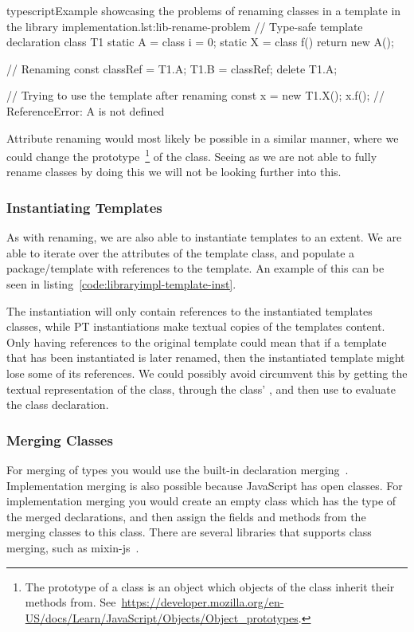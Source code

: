 \begin{code}{typescript}{Example showcasing the problems of renaming classes in a template in the library implementation.}{lst:lib-rename-problem}
    // Type-safe template declaration
    class T1 {
        static A = class {
            i = 0;
        }
        static X = class {
            f() {
                return new A();
            }
        }
    }

   // Renaming
    const classRef = T1.A;
    T1.B = classRef;
    delete T1.A;

    // Trying to use the template after renaming
    const x = new T1.X();
    x.f(); // ReferenceError: A is not defined
\end{code}

Attribute renaming would most likely be possible in a similar manner, where we could change the prototype~\footnote{The prototype of a class is an object which objects of the class inherit their methods from. See~\url{https://developer.mozilla.org/en-US/docs/Learn/JavaScript/Objects/Object_prototypes}.} of the class.
Seeing as we are not able to fully rename classes by doing this we will not be looking further into this.

\subsubsection{Instantiating Templates}\label{subsubsec:instantiating-templates}

As with renaming, we are also able to instantiate templates to an extent.
We are able to iterate over the attributes of the template class, and populate a package/template with references to the template.
An example of this can be seen in listing~\vref{code:libraryimpl-template-inst}.


The instantiation will only contain references to the instantiated templates classes, while PT instantiations make textual copies of the templates content.
Only having references to the original template could mean that if a template that has been instantiated is later renamed, then the instantiated template might lose some of its references.
We could possibly avoid circumvent this by getting the textual representation of the class, through the class' , and then use  to evaluate the class declaration.

\subsubsection{Merging Classes}

For merging of types you would use the built-in declaration merging~\cite{declerationmerging}.
Implementation merging is also possible because JavaScript has open classes.
For implementation merging you would create an empty class which has the type of the merged declarations, and then assign the fields and methods from the merging classes to this class.
There are several libraries that supports class merging, such as mixin-js~\cite{mixinjs}.

